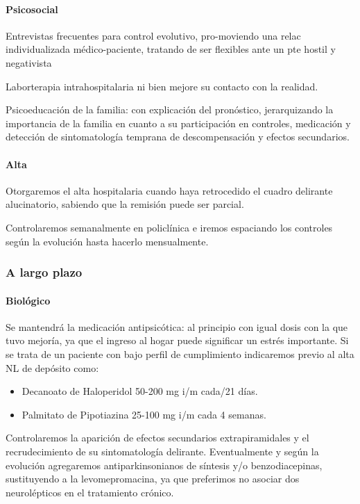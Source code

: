 \paragraph*{Psicosocial}
Entrevistas frecuentes para control evolutivo, pro-moviendo una relac individualizada médico-paciente, tratando de ser flexibles ante un pte hostil y negativista

Laborterapia intrahospitalaria ni bien mejore su contacto con la realidad.

Psicoeducación de la familia: con explicación del pronóstico, jerarquizando la importancia de la familia en cuanto a su participación en controles, medicación y detección de sintomatología temprana de descompensación y efectos secundarios.
\paragraph*{Alta}
Otorgaremos el alta hospitalaria cuando haya retrocedido el cuadro delirante alucinatorio, sabiendo que la remisión puede ser parcial.

Controlaremos semanalmente en policlínica e iremos espaciando los controles según la evolución hasta hacerlo mensualmente.

\subsubsection*{A largo plazo}
\paragraph*{Biológico}
Se mantendrá la medicación antipsicótica\cite{ostuzzi2022preventing}: al principio con igual dosis con la que tuvo mejoría, ya que el ingreso al hogar puede significar un estrés importante. Si se trata de un paciente con bajo perfil de cumplimiento indicaremos previo al alta NL de depósito como:
\begin{itemize}
    \item Decanoato de Haloperidol 50-200 mg i/m cada/21 días.
    \item Palmitato de Pipotiazina 25-100 mg i/m cada 4 semanas.
\end{itemize}
Controlaremos la aparición de efectos secundarios extrapiramidales y el recrudecimiento de su sintomatología delirante. Eventualmente y según la evolución agregaremos antiparkinsonianos de síntesis y/o benzodiacepinas, sustituyendo a la levomepromacina, ya que preferimos no asociar dos neurolépticos en el tratamiento crónico.

